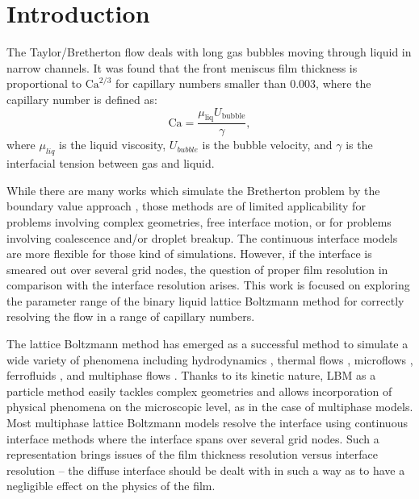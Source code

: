 \documentclass[preprint,12pt]{elsarticle}
\newcommand{\Ca}{\mathrm{Ca}}
\begin{document}
\linenumbers





\section{Introduction}
The Taylor/Bretherton \cite{bretherton} flow deals with long gas bubbles moving through liquid in
narrow channels. It was found that the front meniscus film thickness is proportional
to $\Ca^{2/3}$ for capillary numbers smaller than $0.003$, where the capillary number is defined as:
\begin{equation}
\label{capillary:number:definition}
\Ca=\frac{\mu_\mathrm{liq} U_\mathrm{bubble}}{\gamma},
\end{equation}
where $\mu_{liq}$ is the liquid viscosity, $U_{bubble}$ is the bubble velocity, and
$\gamma$ is the interfacial tension between gas and liquid.

While there are many works which simulate the Bretherton problem by the boundary value approach
\cite{ingham-plates,heil-bretherton}, those methods are of limited applicability for problems
involving complex geometries, free interface motion, or for problems involving coalescence and/or
droplet breakup. The continuous interface models are more flexible for those kind of simulations.
However, if the interface is smeared out over several grid nodes, the question of
proper film resolution in comparison with the interface resolution arises.  This work is focused on
exploring the parameter range of the binary liquid lattice
Boltzmann method for correctly resolving the flow in a range of capillary numbers.

The lattice Boltzmann method has emerged as a successful method to simulate
a wide variety of phenomena including hydrodynamics \cite{yu}, thermal flows
\cite{karlin-minimalmodels}, microflows \cite{ansumali-small-knudsen},
ferrofluids \cite{kuzmin-aniso}, and multiphase flows
\cite{swift,Shan-chen:extended}. Thanks to its kinetic nature, LBM as a particle
method easily tackles complex geometries and allows incorporation of
physical phenomena on the microscopic level, as in the case of multiphase models. Most
multiphase lattice Boltzmann models \cite{swift, Shan-chen:extended} resolve
the interface using continuous interface methods where the interface spans over several grid nodes.
Such a representation
brings issues of the film thickness resolution versus interface
resolution -- the diffuse interface should be dealt with in such a way as to have a
negligible effect on the physics of the film.
\end{document}
